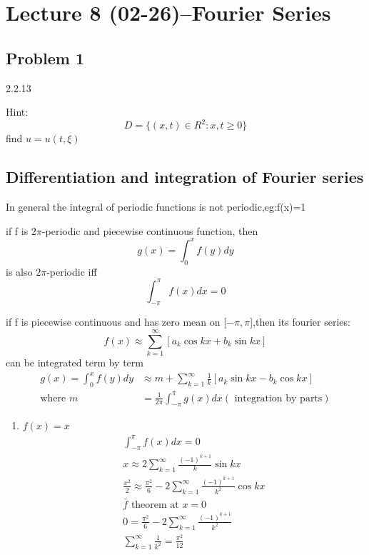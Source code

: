 \section{Lecture 8 (02-26)--Fourier Series}
\subsection*{Problem 1}
2.2.13
\begin{solution}
    Hint:$$
        D=\{(x,t)\in R^2:x,t\geq 0\}
    $$ find $ u=u(t,\xi) $ 
\end{solution}
\subsection{Differentiation and integration of Fourier series}
In general the integral of periodic functions is not periodic,eg:f(x)=1\\
\begin{lemma}[]{}
if f is $ 2\pi $-periodic and piecewise continuous function, then $$
    g(x)=\int_{0}^{x}f(y)dy
$$ is also $ 2\pi $-periodic iff$$
    \int_{-\pi}^{\pi}f(x)dx=0
$$ 
\end{lemma}
\begin{theorem}[]{}
if f is piecewise continuous and has zero mean on [$ -\pi,\pi $],then its fourier series:
$$
    f(x)\approx \sum_{k=1}^{\infty}[a_k\cos{kx}+b_k\sin{kx}]
$$ can be integrated term by term 
\begin{align*}{}{}
g(x)=\int_{0}^{x}f(y)dy&\approx m+ \sum_{k=1}^{\infty}\frac{1}{k}[a_k\sin{kx}-b_k\cos{kx}]\\
\text{where }m&=\frac{1}{2\pi}\int_{-\pi}^{\pi}g(x)dx (\text{ integration by parts})
\end{align*}
\end{theorem}
\begin{example}[]{}
 \begin{enumerate}[label=\circled{\arabic*}] 
 \item $ f(x)=x $
 \begin{align*}{}{}
    \int_{-\pi}^{\pi}f(x)dx=0\\
    x \approx 2\sum_{k=1}^{\infty}\frac{(-1)^{k+1}}{k}\sin{kx}\\  
    \frac{x^2}{2}\approx \frac{\pi^2}{6}-2\sum_{k=1}^{\infty}\frac{(-1)^{k+1}}{k^2}\cos{kx} \\
    \bar{f}  \text{ theorem at }  x=0\\
    0=\frac{\pi^2}{6}-2\sum_{k=1}^{\infty}\frac{(-1)^{k+1}}{k^2}\\
    \sum_{k=1}^{\infty}\frac{1}{k^2}=\frac{\pi^2}{12}
 \end{align*} 
 \end{enumerate}
\end{example}
